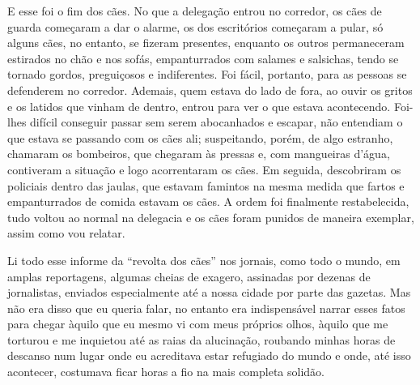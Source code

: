 E esse foi o fim dos cães. No que a delegação entrou no corredor, os
cães de guarda começaram a dar o alarme, os dos escritórios começaram a
pular, só alguns cães, no entanto, se fizeram presentes, enquanto os
outros permaneceram estirados no chão e nos sofás, empanturrados com
salames e salsichas, tendo se tornado gordos, preguiçosos e
indiferentes. Foi fácil, portanto, para as pessoas se defenderem no
corredor. Ademais, quem estava do lado de fora, ao ouvir os gritos e os
latidos que vinham de dentro, entrou para ver o que estava acontecendo.
Foi-lhes difícil conseguir passar sem serem abocanhados e escapar, não
entendiam o que estava se passando com os cães ali; suspeitando, porém,
de algo estranho, chamaram os bombeiros, que chegaram às pressas e, com
mangueiras d'água, contiveram a situação e logo acorrentaram os cães. Em
seguida, descobriram os policiais dentro das jaulas, que estavam
famintos na mesma medida que fartos e empanturrados de comida estavam os
cães. A ordem foi finalmente restabelecida, tudo voltou ao normal na
delegacia e os cães foram punidos de maneira exemplar, assim como vou
relatar.

Li todo esse informe da ``revolta dos cães'' nos jornais, como todo o
mundo, em amplas reportagens, algumas cheias de exagero, assinadas por
dezenas de jornalistas, enviados especialmente até a nossa cidade por
parte das gazetas. Mas não era disso que eu queria falar, no entanto era
indispensável narrar esses fatos para chegar àquilo que eu mesmo vi com
meus próprios olhos, àquilo que me torturou e me inquietou até as raias
da alucinação, roubando minhas horas de descanso num lugar onde eu
acreditava estar refugiado do mundo e onde, até isso acontecer,
costumava ficar horas a fio na mais completa solidão.


